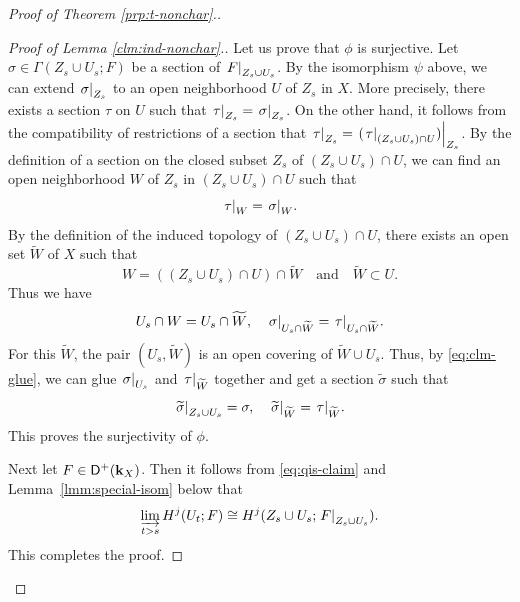 \begin{proof}[{Proof of Theorem \ref{prp:t-nonchar}.}]
\begin{proof}[Proof of Lemma \ref{clm:ind-nonchar}.]
    Let us prove that \(\phi\) is surjective. 
    Let \(
      \sigma\in \Gamma(Z_{s}\cup U_{s};F)
    \) be a section of \(\mres[F]{Z_{s}\cup U_{s}}\). 
    By the isomorphism \(\psi\) above, 
    we can extend \(\mres[\sigma]{Z_{s}}\) to 
    an open neighborhood \(U\) of \(Z_{s}\) in \(X\). 
    More precisely, there exists a section 
    \(\tau\) on \(U\) such that \(
      \mres[\tau]{Z_{s}}=\mres[\sigma]{Z_{s}}
    \). 
    On the other hand, 
    it follows from the compatibility of restrictions of a section
    that \(
      \mres[\tau]{Z_{s}}
      =
      \mres[{(\mres[\tau]{(Z_{s}\cup U_{s})\cap U})}]{Z_{s}}
    \). 
    By the definition of a section 
    on the closed subset \(Z_{s}\) of 
    \((Z_{s}\cup U_{s})\cap U\), 
    we can find an open neighborhood \(W\) of \(Z_{s}\) in 
    \((Z_{s}\cup U_{s})\cap U\) 
    such that 
    \begin{equation*}
      \mres[\tau]{W}=\mres[\sigma]{W}. 
    \end{equation*}
    By the definition of the induced topology 
    of \((Z_{s}\cup U_{s})\cap U\), 
    there exists an open set \(\widetilde{W}\) of \(X\) 
    such that
    \[
      W=((Z_{s}\cup U_{s})\cap U)\cap \widetilde{W}
      \quad\text{and}\quad
      \widetilde{W}\subset U.
    \] 
    Thus we have 
    \begin{equation}\label{eq:clm-glue}
      U_{s}\cap W = U_{s}\cap \widetilde{W},
      \quad
      \mres[\sigma]{U_{s}\cap \widetilde{W}}
      =\mres[\tau]{U_{s}\cap \widetilde{W}}.
    \end{equation}
    For this \(\widetilde{W}\), 
    the pair \(
      \left(U_{s}, \widetilde{W}\right)
    \) is an open covering of \(\widetilde{W}\cup U_{s}\). 
    Thus, by \eqref{eq:clm-glue}, we can 
    glue \(\mres[\sigma]{U_{s}}\) 
    and \(\mres[\tau]{\widetilde{W}}\) together 
    and get a section \(\widetilde{\sigma}\) such that \[
      \mres[\widetilde{\sigma}]{Z_{s}\cup U_{s}} 
      =\sigma, 
      \quad
      \mres[\widetilde{\sigma}]{\widetilde{W}}
      =\mres[\tau]{\widetilde{W}}.
    \]
    This proves the surjectivity of \(\phi\). 
    
    Next let \(F\in\Dompl(\kk_X)\). 
    Then it follows from \eqref{eq:qis-claim} and Lemma~\ref{lmm:special-isom} below 
    that 
    \[
      \indlim[t>s]H^{j}(U_t;F)
      \cong
      H^{j}(Z_{s}\cup U_{s};\mres[F]{Z_{s}\cup U_{s}}).
    \]
    This completes the proof.
  \end{proof}


\end{proof}
